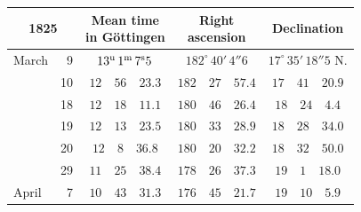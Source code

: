 \begin{center}
\begingroup\small\setlength{\tabcolsep}{4pt}
\begin{tabular}{lr|c|c|c}
\multicolumn{2}{c|}{1825} & \shortstack{Mean time\\in Göttingen} & \shortstack{Right\\ascension} & Declination \\
\hline
March & 9 & $13^{\rm u}\,1^{\rm m}\,7^{\rm s}5$ & $182^{\circ}\,40'\,4''6$ & $17^{\circ}\,35'\,18''5$ N. \\
 & 10 & $12\quad56\quad23.3$ & $182\quad27\quad57.4$ & $17\quad41\quad20.9$ \\
 & 18 & $12\quad18\quad11.1$ & $180\quad46\quad26.4$ & $18\quad24\quad4.4$ \\
 & 19 & $12\quad13\quad23.5$ & $180\quad33\quad28.9$ & $18\quad28\quad34.0$ \\
 & 20 & $12\quad8\quad36.8$ & $180\quad20\quad32.2$ & $18\quad32\quad50.0$ \\
 & 29 & $11\quad25\quad38.4$ & $178\quad26\quad37.3$ & $19\quad1\quad18.0$ \\
April & 7 & $10\quad43\quad31.3$ & $176\quad45\quad21.7$ & $19\quad10\quad5.9$ \\
\end{tabular}
\endgroup
\end{center}
